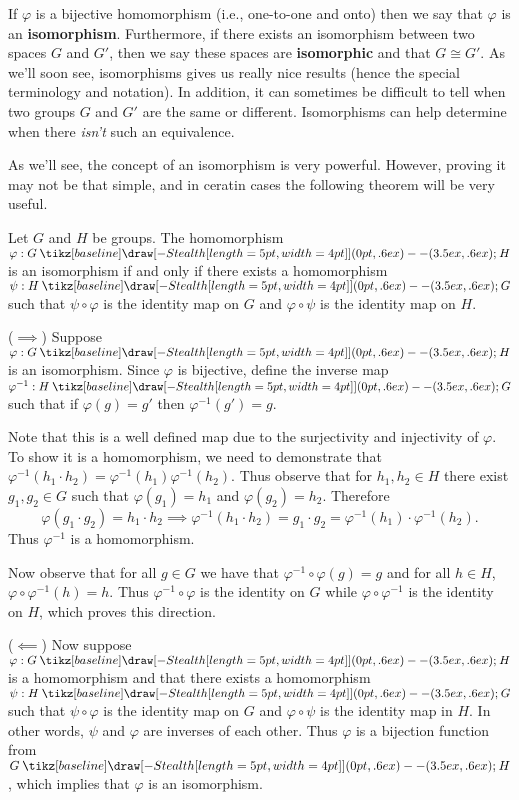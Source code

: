 \documentclass[12pt,letterpaper]{algebra_book}
\renewcommand{\to}{\mathbin{\tikz[baseline] \draw[-{Stealth[length=5pt,width=4pt]}] (0pt,.6ex) -- (3.5ex,.6ex);}}
\renewcommand{\phi}{\varphi}
\theoremstyle{definition}
\begin{document}
    {\color{Plum} 
    If $\phi$ is a bijective homomorphism (i.e., one-to-one and
    onto) then we say that $\phi$ is an \textbf{isomorphism}.
    Furthermore, if there exists an isomorphism between two spaces
    $G$ and $G'$, then we say these spaces are \textbf{isomorphic}
    and that $G \cong G'$. As we'll soon see, isomorphisms gives
    us really nice results (hence the special terminology and
    notation). In addition, it can sometimes be difficult to tell when
    two groups $G$ and $G'$ are the same or different. Isomorphisms
    can help determine when there \textit{isn't} such an equivalence.

    As we'll see, the concept of an isomorphism is very powerful.
    However, proving it may not be that simple, and in ceratin cases
    the following theorem will be very useful.
    }

    \begin{thm}
        Let $G$ and $H$ be groups. The homomorphism $\phi: G \to H$ is an
        isomorphism if and only if there exists a homomorphism $\psi:
        H \to G$ such that $\psi \circ \phi$ is the identity map on
        $G$ and $\phi \circ \psi$ is the identity map on
        $H$.
    \end{thm}

    \begin{prf}
        ($\implies$) Suppose $\phi: G \to H$ is an isomorphism. Since
        $\phi$ is bijective, define the inverse map $\phi^{-1}: H \to
        G$ such that if $\phi(g) = g'$ then $\phi^{-1}(g') = g$. 

        Note that this is a well defined map due to the surjectivity
        and injectivity of $\phi$. To show it is a homomorphism, we
        need to demonstrate that $\phi^{-1}(h_1\cdot h_2) =
        \phi^{-1}(h_1)\phi^{-1}(h_2)$. Thus 
        observe that for $h_1, h_2 \in H$ there exist $g_1, g_2 \in G$
        such that $\phi(g_1) = h_1$ and $\phi(g_2) = h_2$. Therefore
        \[
            \phi(g_1 \cdot g_2) = h_1 \cdot h_2 \implies \phi^{-1}(h_1 \cdot h_2) = g_1\cdot g_2
            = \phi^{-1}(h_1)\cdot\phi^{-1}(h_2).
        \]
        Thus $\phi^{-1}$ is a homomorphism.

        Now observe that for all $g \in G$ we have that $\phi^{-1}
        \circ \phi(g) = g$ and for all $h \in H$, $\phi \circ \phi^{-1}(h) =
        h.$ Thus $\phi^{-1} \circ \phi$ is the identity on $G$ while
        $\phi \circ \phi^{-1}$ is the identity on $H$, which proves
        this direction.

        ($\impliedby$) Now suppose $\phi: G \to H$ is a homomorphism
        and that there exists a homomorphism
        $\psi: H \to G$ such that $\psi \circ \phi$ is the identity
        map on $G$ and $\phi \circ \psi$ is the identity map in $H$.
        In other words, $\psi$ and $\phi$ are inverses of each other. 
        Thus $\phi$ is a bijection function from $G \to H$, which
        implies that $\phi$ is an isomorphism. 
    \end{prf}
    
\end{document}
